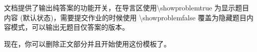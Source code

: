 \documentclass[a4paper, 11pt]{ctexart}
\newcounter{problem}[section]
\let\oldfrac\frac
\renewcommand{\frac}[2]{%
  \mathchoice
    {\oldfrac{\displaystyle #1}{\displaystyle #2}} %
    {\oldfrac{\displaystyle #1}{\displaystyle #2}} %
    {\oldfrac{#1}{#2}}                             %
    {\oldfrac{#1}{#2}}                             %
}
\begin{document}
\begin{problem}
文档提供了输出纯答案的功能开关，在导言区使用\textbackslash{}showproblemtrue 为显示题目内容 (默认状态)，需要提交作业的时候使用 \textbackslash{}showproblemfalse 覆盖为隐藏题目内容模式，可以输出无题目仅答案的版本。
\end{problem}
\begin{answer}
    现在，你可以删除正文部分并且开始使用这份模板了。
\end{answer}

\end{document}
